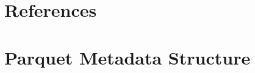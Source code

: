 \documentclass[manuscript]{acmart}
\begin{document}
\section{References}
\label{sec:references}










\appendix{}

\section{Parquet Metadata Structure}
\label{sec:parquet-metadata}
\end{document}
